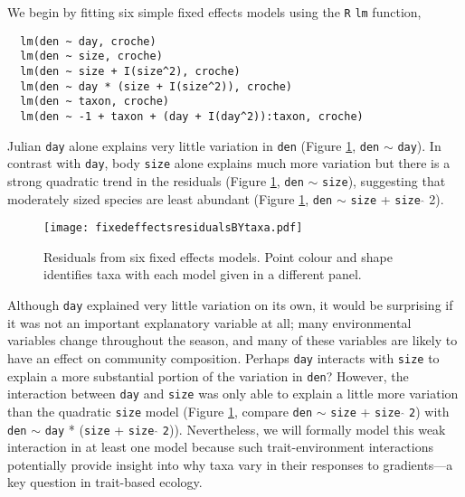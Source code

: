 \documentclass[12pt]{ecologyFORAPPENDIX}
\newcommand{\processfloatnow}{
	\begingroup
	\let\cleardoublepage\relax
	\let\clearpage\relax
	\processdelayedfloats
	\endgroup
}
\begin{document}
We begin by fitting six simple fixed effects models using the \texttt{R} \texttt{lm} function,
\vspace{-18pt}
\singlespace
\begin{verbatim}
  lm(den ~ day, croche)
  lm(den ~ size, croche)
  lm(den ~ size + I(size^2), croche)
  lm(den ~ day * (size + I(size^2)), croche)
  lm(den ~ taxon, croche)
  lm(den ~ -1 + taxon + (day + I(day^2)):taxon, croche)
\end{verbatim}
\doublespace
Julian \texttt{day} alone explains very little variation in \texttt{den} (Figure \ref{fig:fixedeffectsresidualsBYtaxa}, \texttt{den} $\sim$ \texttt{day}).  In contrast with \texttt{day}, body \texttt{size} alone explains much more variation but there is a strong quadratic trend in the residuals (Figure \ref{fig:fixedeffectsresidualsBYtaxa}, \texttt{den} $\sim$ \texttt{size}), suggesting that moderately sized species are least abundant (Figure \ref{fig:fixedeffectsresidualsBYtaxa}, \texttt{den} $\sim$ \texttt{size} + \texttt{size} $\hat{}$ 2).

\begin{figure}
\texttt{[image: fixedeffectsresidualsBYtaxa.pdf]}
\caption{Residuals from six fixed effects models.  Point colour and shape identifies taxa with each model given in a different panel.}
\label{fig:fixedeffectsresidualsBYtaxa}
\end{figure}
\processfloatnow


Although \texttt{day} explained very little variation on its own, it would be surprising if it was not an important explanatory variable at all; many environmental variables change throughout the season, and many of these variables are likely to have an effect on community composition.   
Perhaps \texttt{day} interacts with \texttt{size} to explain a more substantial portion of the variation in \texttt{den}?  However, the interaction between \texttt{day} and \texttt{size} was only able to explain a little more variation than the quadratic \texttt{size} model (Figure \ref{fig:fixedeffectsresidualsBYtaxa}, compare \texttt{den} $\sim$ \texttt{size} + \texttt{size} $\hat{}$ \texttt{2}) with \texttt{den} $\sim$ \texttt{day} * (\texttt{size} + \texttt{size} $\hat{}$ \texttt{2})).  Nevertheless, we will formally model this weak interaction in at least one model because such trait-environment interactions potentially provide insight into why taxa vary in their responses to gradients---a key question in trait-based ecology.
\end{document}

